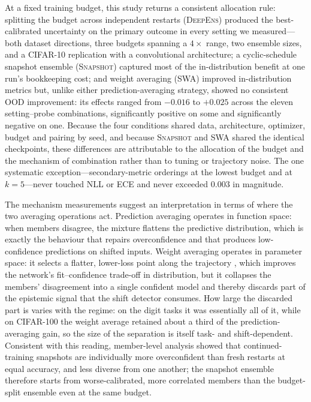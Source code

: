 \documentclass[11pt,a4paper]{article}
\newcommand{\deepens}{\textsc{DeepEns}}
\newcommand{\snapshot}{\textsc{Snapshot}}
\newcommand{\swa}{\textsc{SWA}}
\begin{document}
At a fixed training budget, this study returns a consistent allocation
rule: splitting the budget across independent restarts (\deepens{})
produced the best-calibrated uncertainty on the primary outcome in every
setting we measured---both dataset directions, three budgets spanning a
$4\times$ range, two ensemble sizes, and a CIFAR-10 replication with a
convolutional architecture; a cyclic-schedule snapshot ensemble
(\snapshot{}) captured most of the in-distribution benefit at one run's
bookkeeping cost; and weight averaging (\swa{}) improved in-distribution
metrics but, unlike either prediction-averaging strategy, showed no
consistent OOD improvement: its effects ranged from $-0.016$ to $+0.025$
across the eleven setting--probe combinations, significantly positive on
some and significantly negative on one.
Because the four conditions shared data, architecture, optimizer, budget and
pairing by seed, and because \snapshot{} and \swa{} shared the identical
checkpoints, these differences are attributable to the allocation of the
budget and the mechanism of combination rather than to tuning or trajectory
noise. The one systematic exception---secondary-metric orderings at the
lowest budget and at $k=5$---never touched NLL or ECE and never exceeded
$0.003$ in magnitude.

The mechanism measurements suggest an interpretation in terms of where the
two averaging operations act. Prediction averaging operates in function
space: when members disagree, the mixture flattens the predictive
distribution, which is exactly the behaviour that repairs overconfidence
and that produces low-confidence predictions on shifted inputs. Weight
averaging operates in parameter space: it selects a flatter, lower-loss
point along the trajectory \citep{izmailov2018,wilson2020}, which improves
the network's fit--confidence trade-off in distribution, but it collapses
the members' disagreement into a single confident model and thereby
discards part of the epistemic signal that the shift detector consumes.
How large the discarded part is varies with the regime: on the digit tasks
it was essentially all of it, while on CIFAR-100 the weight average
retained about a third of the prediction-averaging gain, so the size of
the separation is itself task- and shift-dependent. Consistent
with this reading, member-level analysis showed that continued-training
snapshots are individually more overconfident than fresh restarts at equal
accuracy, and less diverse from one another; the snapshot ensemble
therefore starts from worse-calibrated, more correlated members than the
budget-split ensemble even at the same budget.
\end{document}
